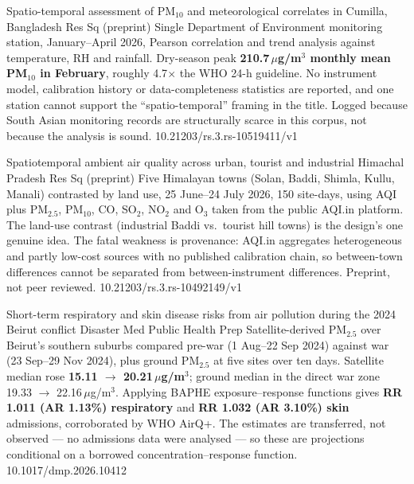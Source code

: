 \documentclass[10pt]{article}
\begin{document}
{Spatio-temporal assessment of PM$_{10}$ and meteorological correlates in Cumilla, Bangladesh}
{Res Sq (preprint)}
{Single Department of Environment monitoring station, January--April 2026, Pearson
correlation and trend analysis against temperature, RH and rainfall. Dry-season peak
\textbf{210.7\,$\mu$g/m$^3$ monthly mean PM$_{10}$ in February}, roughly 4.7$\times$ the
WHO 24-h guideline. No instrument model, calibration history or data-completeness
statistics are reported, and one station cannot support the ``spatio-temporal'' framing
in the title. Logged because South Asian monitoring records are structurally scarce in
this corpus, not because the analysis is sound.}
{10.21203/rs.3.rs-10519411/v1}

{Spatiotemporal ambient air quality across urban, tourist and industrial Himachal Pradesh}
{Res Sq (preprint)}
{Five Himalayan towns (Solan, Baddi, Shimla, Kullu, Manali) contrasted by land use,
25 June--24 July 2026, 150 site-days, using AQI plus PM$_{2.5}$, PM$_{10}$, CO,
SO$_2$, NO$_2$ and O$_3$ taken from the public AQI.in platform. The land-use contrast
(industrial Baddi vs.\ tourist hill towns) is the design's one genuine idea. The fatal
weakness is provenance: AQI.in aggregates heterogeneous and partly low-cost sources with
no published calibration chain, so between-town differences cannot be separated from
between-instrument differences. Preprint, not peer reviewed.}
{10.21203/rs.3.rs-10492149/v1}


{Short-term respiratory and skin disease risks from air pollution during the 2024 Beirut conflict}
{Disaster Med Public Health Prep}
{Satellite-derived PM$_{2.5}$ over Beirut's southern suburbs compared pre-war
(1 Aug--22 Sep 2024) against war (23 Sep--29 Nov 2024), plus ground PM$_{2.5}$ at five
sites over ten days. Satellite median rose \textbf{15.11 $\rightarrow$
20.21\,$\mu$g/m$^3$}; ground median in the direct war zone 19.33 $\rightarrow$
22.16\,$\mu$g/m$^3$. Applying BAPHE exposure--response functions gives \textbf{RR 1.011
(AR 1.13\%) respiratory} and \textbf{RR 1.032 (AR 3.10\%) skin} admissions, corroborated
by WHO AirQ+. The estimates are transferred, not observed --- no admissions data were
analysed --- so these are projections conditional on a borrowed concentration--response
function.}
{10.1017/dmp.2026.10412}
\end{document}
